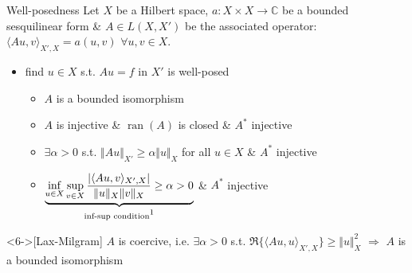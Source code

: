 \documentclass[11pt,aspectratio=169,xcolor=dvipsnames]{beamer}
\DeclareMathOperator{\ran}{ran}
\newcommand{\spl}{\langle}
\newcommand{\spr}{\rangle}
\newcommand{\nicearrow}[2]{\raisebox{#2}{\resizebox{0.45cm}{!}{\color{#1}{\MVRightArrow}\color{black}}}}
\begin{document}
\begin{frame}{Well-posedness}
    Let $X$ be a Hilbert space, $a : X \times X \to \mathbb{C}$ be a \alert{bounded} sesquilinear form \& $A \in L(X,X')$ be the associated operator: $\spl Au,v \spr_{X',X} = a(u,v)$ $\forall u,v \in X$. 
    \begin{itemize}
        \item[\nicearrow{GOE}{-0.06cm}] find $u \in X$ s.t. $A u = f$ in $X'$ is \alert{well-posed}
        \begin{itemize}
            \item<2->[\color{black}$\Leftrightarrow$] $A$ is a bounded isomorphism
            \item<3->[\color{black}$\Leftrightarrow$]  $A$ is injective \& $\ran(A)$ is closed \& $A^\ast$ injective
            \item<4->[\color{black}$\Leftrightarrow$] $\exists \alpha > 0$ s.t. $\Vert A u \Vert_{X'} \ge \alpha \Vert u \Vert_{X}$ for all $u \in X$ \& $A^\ast$ injective
            \item<5->[\color{black}$\Leftrightarrow$] $\underbrace{\inf_{u \in X} \sup_{v \in X} \frac{\vert \spl Au,v \spr_{X',X} \vert}{\Vert u \Vert_{X} \Vert v \Vert_X} \ge \alpha > 0}_{\text{inf-sup condition}\footnotemark}$ \& $A^\ast$ injective
        \end{itemize}
    \end{itemize}
    \begin{theorem}<6->[Lax-Milgram]
        $A$ is coercive, i.e. $\exists \alpha > 0$ s.t. $\Re \{ \spl Au,u \spr_{X',X} \} \ge \Vert u \Vert_X^2$ $\Rightarrow$ $A$ is a bounded isomorphism
    \end{theorem}
\end{frame}
\end{document}
